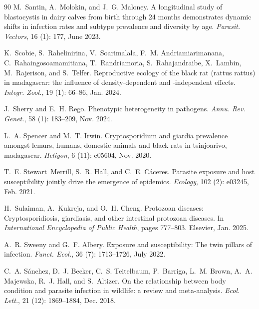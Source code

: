 \documentclass[oneside, a4paper, onecolumn, 11pt]{article}
\begin{document}
\begin{thebibliography}{90}
M.~Santin, A.~Molokin, and J.~G. Maloney.
\newblock A longitudinal study of blastocystis in dairy calves from birth through 24 months demonstrates dynamic shifts in infection rates and subtype prevalence and diversity by age.
\newblock \emph{Parasit. Vectors}, 16 (1): 177, June 2023.

K.~Scobie, S.~Rahelinirina, V.~Soarimalala, F.~M. Andriamiarimanana, C.~Rahaingosoamamitiana, T.~Randriamoria, S.~Rahajandraibe, X.~Lambin, M.~Rajerison, and S.~Telfer.
\newblock Reproductive ecology of the black rat (rattus rattus) in madagascar: the influence of density-dependent and -independent effects.
\newblock \emph{Integr. Zool.}, 19 (1): 66--86, Jan. 2024.

J.~Sherry and E.~H. Rego.
\newblock Phenotypic heterogeneity in pathogens.
\newblock \emph{Annu. Rev. Genet.}, 58 (1): 183--209, Nov. 2024.

L.~A. Spencer and M.~T. Irwin.
\newblock Cryptosporidium and giardia prevalence amongst lemurs, humans, domestic animals and black rats in tsinjoarivo, madagascar.
\newblock \emph{Heliyon}, 6 (11): e05604, Nov. 2020.

T.~E. Stewart~Merrill, S.~R. Hall, and C.~E. Cáceres.
\newblock Parasite exposure and host susceptibility jointly drive the emergence of epidemics.
\newblock \emph{Ecology}, 102 (2): e03245, Feb. 2021.

H.~Sulaiman, A.~Kukreja, and O.~H. Cheng.
\newblock Protozoan diseases: Cryptosporidiosis, giardiasis, and other intestinal protozoan diseases.
\newblock In \emph{International Encyclopedia of Public Health}, pages 777--803. Elsevier, Jan. 2025.

A.~R. Sweeny and G.~F. Albery.
\newblock Exposure and susceptibility: The twin pillars of infection.
\newblock \emph{Funct. Ecol.}, 36 (7): 1713--1726, July 2022.

C.~A. Sánchez, D.~J. Becker, C.~S. Teitelbaum, P.~Barriga, L.~M. Brown, A.~A. Majewska, R.~J. Hall, and S.~Altizer.
\newblock On the relationship between body condition and parasite infection in wildlife: a review and meta-analysis.
\newblock \emph{Ecol. Lett.}, 21 (12): 1869--1884, Dec. 2018.


\end{thebibliography}
\end{document}
